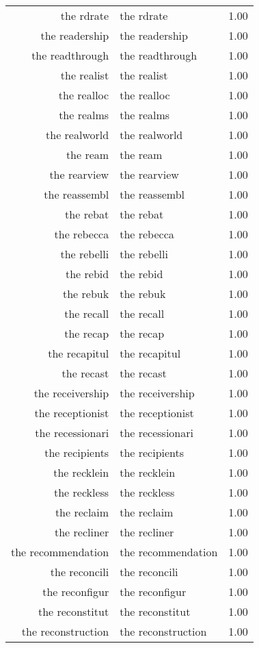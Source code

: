 \begin{table}[ht]
\begin{tabular}{rlr}
  the rdrate & the rdrate & 1.00 \\ 
  the readership & the readership & 1.00 \\ 
  the readthrough & the readthrough & 1.00 \\ 
  the realist & the realist & 1.00 \\ 
  the realloc & the realloc & 1.00 \\ 
  the realms & the realms & 1.00 \\ 
  the realworld & the realworld & 1.00 \\ 
  the ream & the ream & 1.00 \\ 
  the rearview & the rearview & 1.00 \\ 
  the reassembl & the reassembl & 1.00 \\ 
  the rebat & the rebat & 1.00 \\ 
  the rebecca & the rebecca & 1.00 \\ 
  the rebelli & the rebelli & 1.00 \\ 
  the rebid & the rebid & 1.00 \\ 
  the rebuk & the rebuk & 1.00 \\ 
  the recall & the recall & 1.00 \\ 
  the recap & the recap & 1.00 \\ 
  the recapitul & the recapitul & 1.00 \\ 
  the recast & the recast & 1.00 \\ 
  the receivership & the receivership & 1.00 \\ 
  the receptionist & the receptionist & 1.00 \\ 
  the recessionari & the recessionari & 1.00 \\ 
  the recipients & the recipients & 1.00 \\ 
  the recklein & the recklein & 1.00 \\ 
  the reckless & the reckless & 1.00 \\ 
  the reclaim & the reclaim & 1.00 \\ 
  the recliner & the recliner & 1.00 \\ 
  the recommendation & the recommendation & 1.00 \\ 
  the reconcili & the reconcili & 1.00 \\ 
  the reconfigur & the reconfigur & 1.00 \\ 
  the reconstitut & the reconstitut & 1.00 \\ 
  the reconstruction & the reconstruction & 1.00 \\ 

\end{tabular}
\end{table}
